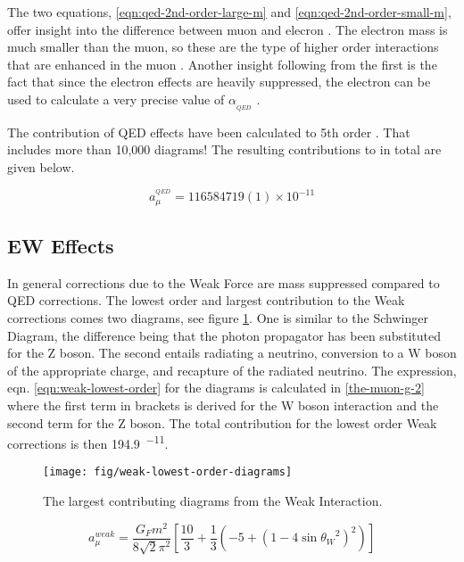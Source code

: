 The two equations, \ref{eqn:qed-2nd-order-large-m} and \ref{eqn:qed-2nd-order-small-m}, offer insight into the difference between muon and elecron \gmtwo.  The electron mass is much smaller than the muon, so these are the type of higher order interactions that are enhanced in the muon \gmtwo.  Another insight following from the first is the fact that since the electron effects are heavily suppressed, the electron \gmtwo can be used to calculate a very precise value of $\alpha_{_{QED}}$ \cite{amm-of-muon}.

The contribution of QED effects have been calculated to 5th order .  That includes more than 10,000 diagrams!  The resulting contributions to \mugmtwo in total are given below.

\begin{equation}
\label{eqn:qed-total}
a_\mu^{^{QED}} = 116 584 719(1) \times 10^{-11}
\end{equation}

\subsection{EW Effects} \label{s-sec:theory-ew}

In general corrections due to the Weak Force are mass suppressed compared to QED corrections.  The lowest order and largest contribution to the Weak corrections comes two diagrams, see figure \ref{fig:weak-lowest-order-diagrams}. One is similar to the Schwinger Diagram, the difference being that the photon propagator has been substituted for the Z boson.  The second entails radiating  a neutrino, conversion to a W boson of the appropriate charge, and recapture of the radiated neutrino.  The expression, eqn. \ref{eqn:weak-lowest-order} for the diagrams is calculated in \ref{the-muon-g-2} where the first term in brackets is derived for the W boson interaction and the second term for the Z boson.  The total contribution for the lowest order Weak corrections is then \SI{194.9}{^{-11}}.

\begin{figure}
\label{fig:weak-lowest-order-diagrams}
\texttt{[image: fig/weak-lowest-order-diagrams]}
\caption{The largest contributing diagrams from the Weak Interaction.}
\end{figure}

\begin{equation}
\label{eqn:weak-lowest-order}
a_\mu^{weak} = \frac{G_F m^2}{8\sqrt{2}\pi^2} [\frac{10}{3} + \frac{1}{3}(-5 + (1 - 4\sin{\theta_W}^2)^2)]
\end{equation}

